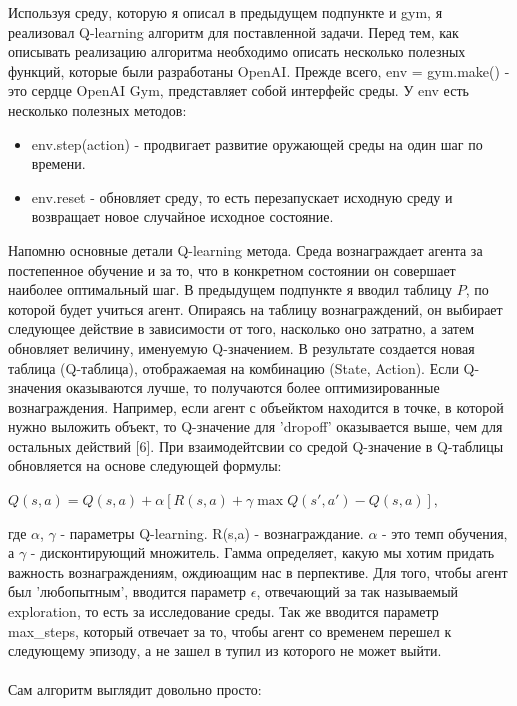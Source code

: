 \documentclass[a4paper]{report}
\theoremstyle{definition}
\theoremstyle{plain}
\theoremstyle{remark}
\theoremstyle{remark}
\theoremstyle{definition}
\begin{document}
Используя среду, которую я описал в предыдущем подпункте и gym, я реализовал Q-learning алгоритм для поставленной задачи. Перед тем, как описывать реализацию алгоритма необходимо описать несколько полезных функций, которые были разработаны OpenAI. Прежде всего, env = gym.make() - это сердце OpenAI Gym, представляет собой интерфейс среды. У env есть несколько полезных методов:
\begin{itemize}
    \item env.step(action) - продвигает развитие оружающей среды на один шаг по времени.
    \item env.reset - обновляет среду, то есть перезапускает исходную среду и возвращает новое случайное исходное состояние.
\end{itemize}
Напомню основные детали Q-learning метода. Среда вознаграждает агента за постепенное обучение и за то, что в конкретном состоянии он совершает наиболее оптимальный шаг. В предыдущем подпункте я вводил таблицу $P$, по которой будет учиться агент. Опираясь на таблицу вознаграждений, он выбирает следующее действие в зависимости от того, насколько оно затратно, а затем обновляет величину, именуемую Q-значением. В результате создается новая таблица (Q-таблица), отображаемая на комбинацию (State, Action). Если Q-значения оказываются лучше, то получаются более оптимизированные вознаграждения. Например, если агент с объейктом находится в точке, в которой нужно выложить объект, то Q-значение для 'dropoff' оказывается выше, чем для остальных действий [6]. При взаимодейтсвии со средой Q-значение в Q-таблицы обновляется на основе следующей формулы:
\begin{center}
    $
    Q(s,a) = Q(s,a) + \alpha[R(s,a) + \gamma \max Q(s',a') - Q(s,a)],
    $
\end{center}
где $\alpha$, $\gamma$ - параметры Q-learning. R(s,a) - вознаграждание. $\alpha$ - это темп обучения, а $\gamma$ - дисконтирующий множитель. Гамма определяет, какую мы хотим придать важность вознаграждениям, ождиюащим нас в перпективе. Для того, чтобы агент был 'любопытным', вводится параметр $\epsilon$, отвечающий за так называемый exploration, то есть за исследование среды. Так же вводится параметр max\_steps, который отвечает за то, чтобы агент со временем перешел к следующему эпизоду, а не зашел в тупил из которого не может выйти.\\
\\
Сам алгоритм выглядит довольно просто:
\end{document}
